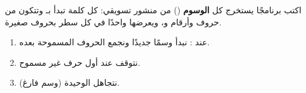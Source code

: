 \begin{statement}
اكتب برنامجًا يستخرج كل \textbf{الوسوم} () من منشور تسويقي: كل كلمة تبدأ بـ \code{\#} وتتكون من حروف وأرقام و\code{\_}، ويعرضها واحدًا في كل سطر بحروف صغيرة.
\end{statement}
\begin{stepsbox}\begin{enumerate}
\item عند \code{\#}: نبدأ وسمًا جديدًا ونجمع الحروف المسموحة بعده.
\item نتوقف عند أول حرف غير مسموح.
\item نتجاهل \code{\#} الوحيدة (وسم فارغ).
\end{enumerate}\end{stepsbox}
